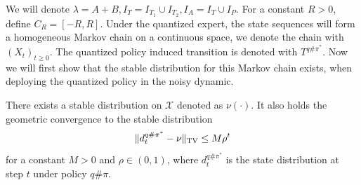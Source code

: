 \documentclass{article}
\begin{document}
We will denote $\lambda=A+B, I_T=I_{T_1}\cup I_{T_2}, I_A=I_T\cup I_P$. For a constant $R>0$, define $C_R=[-R,R]$. Under the quantized expert, the state sequences will form a homogeneous Markov chain on a continuous space, we denote the chain with $(X_t)_{t\geq 0}$. The quantized policy induced transition is denoted with $T^{q\#\pi^*}$. Now we will first show that the stable distribution for this Markov chain exists, when deploying the quantized policy in the noisy dynamic. 

\begin{claim}
    There exists a stable distribution on $\mathcal X$ denoted as $\nu(\cdot)$.  It also holds the geometric convergence to the stable distribution
    \begin{equation*}
        \|d^{q\#\pi^*}_t-\nu\|_{\textnormal{TV}}\leq M\rho^t
    \end{equation*}
    for a constant $M>0$ and $\rho\in (0,1)$, where $d^{q\#\pi^*}_t$ is the state distribution at step $t$ under policy $q\#\pi$.
\end{claim}
\end{document}

